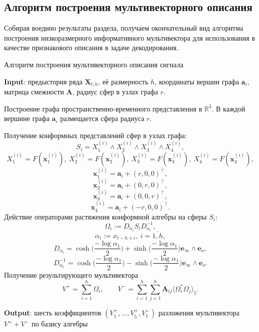 \documentclass[12pt]{article}
\begin{document}
\newpage
\subsection{Алгоритм построения мультивекторного описания}

Собирая воедино результаты раздела, получаем окончательный вид алгоритма построения низкоразмерного информативного мультивектора для использования в качестве признакового описания в задаче декодирования.

\begin{algorithm}[h!]
	\caption{Алгоритм построения мультивекторного описания сигнала}
	\hspace*{\algorithmicindent} 
	\textbf{Input}: предыстория ряда $\textbf{X}_{t,h}$, её размерность $h$, координаты вершин графа $\mathbf{a}_i$, матрица смежности $\textbf{A}$, радиус сфер в узлах графа $r$. 
	\begin{algorithmic}[1]
	    \STATE Построение графа пространственно-временного представления в $\mathds{R}^3$. В каждой вершине графа $\mathbf{a}_i$ размещается сфера радиуса $r$.
	    
	    \STATE Получение конформных представлений сфер в узлах графа:
	    $$S_i = X_1^{(i)} \wedge X_2^{(i)} \wedge X_3^{(i)} \wedge X_4^{(i)},$$ $$X_1^{(i)} = F(\mathbf{x}_1^{(i)}), \ X_2^{(i)} = F(\mathbf{x}_2^{(i)}), \ X_3^{(i)} = F(\mathbf{x}_3^{(i)}), \ X_4^{(i)} = F(\mathbf{x}_4^{(i)}),$$
	        $$\mathbf{x}_1^{(i)} = \mathbf{a}_i + (r, 0, 0)^{\intercal},$$
    $$\mathbf{x}_2^{(i)} = \mathbf{a}_i + (0, r, 0)^{\intercal},$$
    $$\mathbf{x}_3^{(i)} = \mathbf{a}_i + (0, 0, r)^{\intercal},$$
    $$\mathbf{x}_4^{(i)} = \mathbf{a}_i + (-r, 0, 0)^{\intercal}.$$
	    \STATE Действие операторами растяжения конформной алгебры на  сферы $S_i$:
	    $$\Omega_i := D_{\alpha_i} S_i D_{\alpha_i}^{-1}, $$
	    $$ \alpha_i := x_{t-h+i}, \ i = \overline{1,h},$$
	$$D_{\alpha_i} = \cosh\Bigg(\frac{- \log \alpha_1}{2}\Bigg) + \sinh\Bigg(\frac{- \log \alpha_1}{2}\Bigg) \mathbf{e}_{\infty} \wedge \mathbf{e}_o,  $$
$$D_{\alpha_i}^{-1} = \cosh\Bigg(\frac{- \log \alpha_1}{2}\Bigg) - \sinh\Bigg(\frac{ - \log \alpha_1}{2}\Bigg) \mathbf{e}_{\infty} \wedge \mathbf{e}_o  . $$
	\STATE Получение результирующего мультивектора
	$$ V^+ = \sum_{i = 1}^h \Omega_i, \quad \quad V^- = \sum_{i = 1}^h\sum_{j = 1}^h \textbf{A}_{ij}\big\langle \Omega_i^* \Omega_j \big\rangle_5.$$
		
	\end{algorithmic}
	\hspace*{\algorithmicindent} 
	\textbf{Output}: шесть коэффициентов $(V_1^+, \dots, V_5^+, V_1^-)$ разложения мультивектора $V^+ + V^-$ по базису алгебры 
\end{algorithm}
\end{document}
